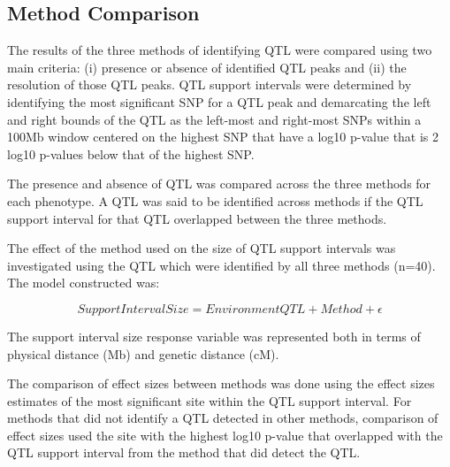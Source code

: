 \documentclass[article,9pt,twocolumn,twoside]{rilabRxiv}
\begin{document}
\subsection{Method Comparison}
The results of the three methods of identifying QTL were compared using two main criteria: (i) presence or absence of identified QTL peaks and (ii) the resolution of those QTL peaks. %
QTL support intervals were determined by identifying the most significant SNP for a QTL peak and demarcating the left and right bounds of the QTL as the left-most and right-most SNPs within a 100Mb window centered on the highest SNP that have a log10 p-value that is 2 log10 p-values below that of the highest SNP.

The presence and absence of QTL was compared across the three methods for each phenotype. A QTL was said to be identified across methods if the QTL support interval for that QTL overlapped between the three methods.

The effect of the method used on the size of QTL support intervals was investigated using the QTL which were identified by all three methods (n=40). The model constructed was:

\begin{equation}
\label{eqn:bounds}
 Support Interval Size = Environment QTL + Method + \epsilon
\end{equation}

The support interval size response variable was represented both in terms of physical distance (Mb) and genetic distance (cM).

The comparison of effect sizes between methods was done using the effect sizes estimates of the most significant site within the QTL support interval. For methods that did not identify a QTL detected in other methods, comparison of effect sizes used the site with the highest log10 p-value that overlapped with the QTL support interval from the method that did detect the QTL.
\end{document}
